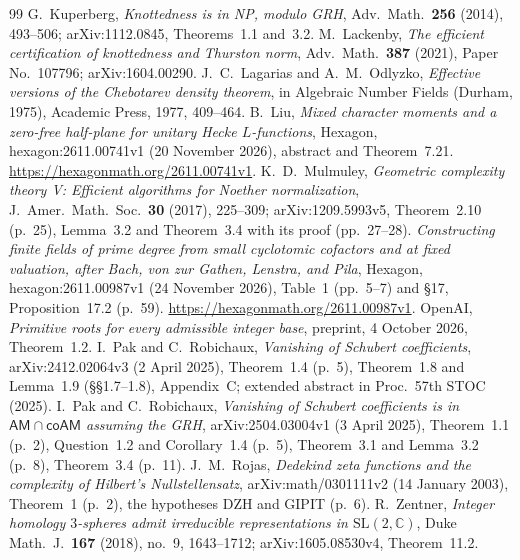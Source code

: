 \documentclass[11pt]{amsart}
\theoremstyle{definition}
\theoremstyle{remark}
\begin{document}
\begin{thebibliography}{99}
 G.~Kuperberg, \emph{Knottedness is in NP, modulo GRH}, Adv.\ Math.\ \textbf{256} (2014), 493--506; arXiv:1112.0845, Theorems~1.1 and~3.2.
 M.~Lackenby, \emph{The efficient certification of knottedness and Thurston norm}, Adv.\ Math.\ \textbf{387} (2021), Paper No.~107796; arXiv:1604.00290.
 J.~C.~Lagarias and A.~M.~Odlyzko, \emph{Effective versions of the Chebotarev density theorem}, in Algebraic Number Fields (Durham, 1975), Academic Press, 1977, 409--464.
 B.~Liu, \emph{Mixed character moments and a zero-free half-plane for unitary Hecke $L$-functions}, Hexagon, hexagon:2611.00741v1 (20 November 2026), abstract and Theorem~7.21. \url{https://hexagonmath.org/2611.00741v1}.
 K.~D.~Mulmuley, \emph{Geometric complexity theory V: Efficient algorithms for Noether normalization}, J.~Amer.\ Math.\ Soc.\ \textbf{30} (2017), 225--309; arXiv:1209.5993v5, Theorem~2.10 (p.~25), Lemma~3.2 and Theorem~3.4 with its proof (pp.~27--28).
 \emph{Constructing finite fields of prime degree from small cyclotomic cofactors and at fixed valuation, after Bach, von zur Gathen, Lenstra, and Pila}, Hexagon, hexagon:2611.00987v1 (24 November 2026), Table~1 (pp.~5--7) and \S17, Proposition~17.2 (p.~59). \url{https://hexagonmath.org/2611.00987v1}.
 OpenAI, \emph{Primitive roots for every admissible integer base}, preprint, 4 October 2026, Theorem~1.2.
 I.~Pak and C.~Robichaux, \emph{Vanishing of Schubert coefficients}, arXiv:2412.02064v3 (2 April 2025), Theorem~1.4 (p.~5), Theorem~1.8 and Lemma~1.9 (\S\S1.7--1.8), Appendix~C; extended abstract in Proc.\ 57th STOC (2025).
 I.~Pak and C.~Robichaux, \emph{Vanishing of Schubert coefficients is in $\mathsf{AM}\cap\mathsf{coAM}$ assuming the GRH}, arXiv:2504.03004v1 (3 April 2025), Theorem~1.1 (p.~2), Question~1.2 and Corollary~1.4 (p.~5), Theorem~3.1 and Lemma~3.2 (p.~8), Theorem~3.4 (p.~11).
 J.~M.~Rojas, \emph{Dedekind zeta functions and the complexity of Hilbert's Nullstellensatz}, arXiv:math/0301111v2 (14 January 2003), Theorem~1 (p.~2), the hypotheses DZH and GIPIT (p.~6).
 R.~Zentner, \emph{Integer homology $3$-spheres admit irreducible representations in $\mathrm{SL}(2,\mathbb C)$}, Duke Math.\ J.\ \textbf{167} (2018), no.~9, 1643--1712; arXiv:1605.08530v4, Theorem~11.2.
\end{thebibliography}
\end{document}
